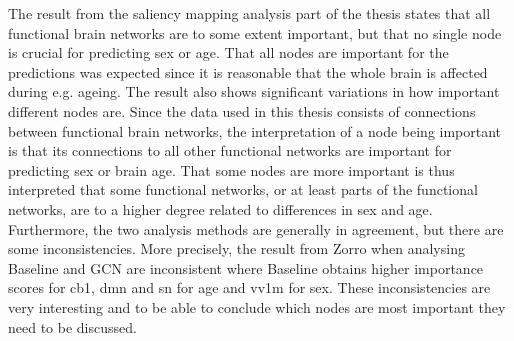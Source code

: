         


The result from the saliency mapping analysis part of the thesis states that all functional brain networks are to some extent important, but that no single node is crucial for predicting sex or age. That all nodes are important for the predictions was expected since it is reasonable that the whole brain is affected during e.g. ageing. The result also shows significant variations in how important different nodes are. Since the data used in this thesis consists of connections between functional brain networks, the interpretation of a node being important is that its connections to all other functional networks are important for predicting sex or brain age. That some nodes are more important is thus interpreted that some functional networks, or at least parts of the functional networks, are to a higher degree related to differences in sex and age. Furthermore, the two analysis methods are generally in agreement, but there are some inconsistencies. More precisely, the result from Zorro when analysing Baseline and GCN are inconsistent where Baseline obtains higher importance scores for \acrshort{cb1}, \acrshort{dmn} and \acrshort{sn} for age and \acrshort{vv1m} for sex. These inconsistencies are very interesting and to be able to conclude which nodes are most important they need to be discussed. 




